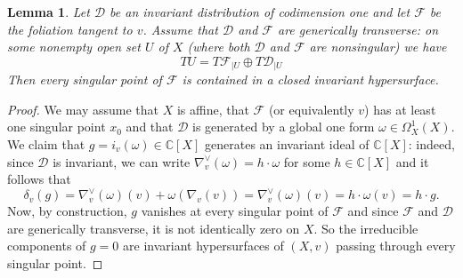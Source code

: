 \documentclass[12pt]{amsart}
\theoremstyle{definition}
\theoremstyle{plain}
\newtheorem{lemma}[definition]{Lemma}
\theoremstyle{exampstyle}
\theoremstyle{exampstyle}\newtheorem{thmxbis}{Theorem}
\numberwithin{equation}{section}
\theoremstyle{remark}
\begin{document}
\begin{lemma} \label{lemma-tangent}
Let $\mathcal D$ be an invariant distribution of codimension one and let $\mathcal F$ be the foliation tangent to $v$. Assume that $\mathcal D$ and $\mathcal F$ are generically transverse: on some nonempty open set $U$ of $X$ (where both $\mathcal D$ and $\mathcal F$ are nonsingular) we have 
$$ TU = T\mathcal F_{\mid U} \oplus T\mathcal D_{\mid U}$$
Then every singular point of $\mathcal F$ is contained in a closed invariant hypersurface. 
\end{lemma} 
\begin{proof} 
We may assume that $X$ is affine, that $\mathcal F$ (or equivalently $v$) has at least one singular point $x_0$ and that $\mathcal D$ is generated by a global one form $\omega \in \Omega^1_X(X)$. We claim that $g = i_v (\omega) \in \mathbb{C}[X]$ generates an invariant ideal of $\mathbb{C}[X]$: indeed, since $\mathcal D$ is invariant, we can write $\nabla_v^\vee(\omega) = h \cdot \omega$ for some $h \in \mathbb{C}[X]$ and it follows that 
$$\delta_v(g) = \nabla_v^\vee(\omega)(v) + \omega(\nabla_v(v)) = \nabla_v^\vee(\omega)(v) = h \cdot \omega(v) = h \cdot g .$$
Now, by construction, $g$ vanishes at every singular point of $\mathcal F$ and since $\mathcal F$ and $\mathcal D$ are generically transverse, it is not identically zero on $X$. So the irreducible components of $g = 0$ are invariant hypersurfaces of $(X,v)$ passing through every singular point.
%
\end{proof} 
\end{document}
